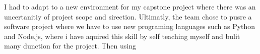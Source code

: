 \documentclass[11pt, a4paper]{awesome-cv} %
\newcommand\tab[1][1cm]{\hspace*{#1}}
\begin{document}
\begin{cvletter}
\tab I had to adapt to a new environment for my capstone project where there was an uncertanitiy of project scope and sirection. Ultimatly, the team chose to pusre a software project where we have to use new programing languages such as Python and Node.js, where i have aquired this skill by self teaching myself and bulit many dunction for the project. Then using 










\end{cvletter}


\makeletterclosing %
\end{document}
